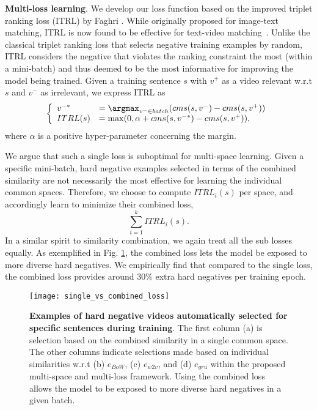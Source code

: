 \textbf{Multi-loss learning}. We develop our loss function based on the improved triplet ranking loss (ITRL) by Faghri \etal \cite{vsepp}. While originally proposed for image-text matching, ITRL is now found to be effective for text-video matching~\cite{mithun-icmr18,w2vvpp,dong-cvpr19,liu-bmvc19,tv19-alibaba}. Unlike the classical triplet ranking loss that selects negative training examples by random, ITRL considers the negative that violates the ranking constraint the most (within a mini-batch) and thus deemed to be the most informative for improving the model being trained. Given a training sentence $s$ with $v^+$ as a video relevant w.r.t $s$ and $v^-$ as irrelevant, we express ITRL as 
\begin{equation} \label{eq:single-loss}
\left\{ \begin{array}{ll}
 v^{-*} &= \argmax_{v^- \in batch} (cms(s,v^-) - cms(s,v^+)) \\
 ITRL(s) &=\max(0, \alpha + cms(s,v^{-*}) -cms(s,v^+)), \end{array} \right.
\end{equation}
where $\alpha$ is a positive hyper-parameter concerning the margin.




We argue that such a single loss is suboptimal for multi-space learning. Given a specific mini-batch, hard negative examples selected in terms of the combined similarity are not necessarily the most effective for learning the individual common spaces. Therefore, we choose to compute $ITRL_i(s)$ per space, and accordingly learn to minimize their combined loss, \ie
\begin{equation}
\sum_{i=1}^k ITRL_i(s).
\end{equation}
In a similar spirit to similarity combination, we again treat all the sub losses equally. As exemplified in Fig. \ref{fig:hard-negative}, the combined loss lets the model be exposed to more diverse hard negatives. We empirically find that compared to the single loss, the combined loss provides around 30\% extra hard negatives per training epoch. 


\begin{figure}[tbh!]
\centering
\texttt{[image: single\_vs\_combined\_loss]}
\caption{\textbf{Examples of hard negative videos automatically selected for specific sentences during training}. The first column (a) is selection based on the combined similarity in a single common space. The other columns indicate selections made based on individual similarities w.r.t (b) $e_{BoW}$, (c) $e_{w2v}$, and (d) $e_{gru}$ within the proposed multi-space and multi-loss framework. Using the combined loss allows the model to be exposed to more diverse hard negatives in a given batch.}
\label{fig:hard-negative}
\end{figure}



